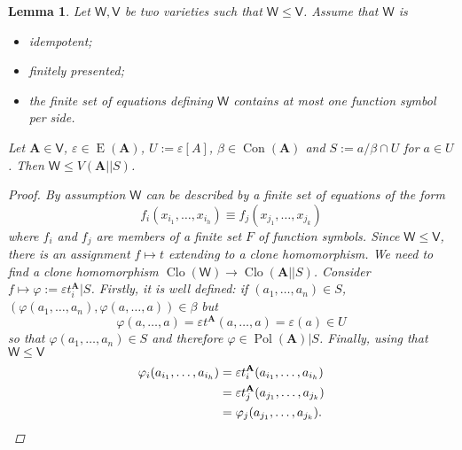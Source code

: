 \documentclass{amsart}
\theoremstyle{plain}
\newtheorem{lemma}[theorem]{Lemma}
\theoremstyle{definition}
\theoremstyle{remark}
\def\phi{\varphi}
\def\epsilon{\varepsilon}
\DeclareMathOperator{\Clo}{Clo}
\DeclareMathOperator{\Con}{Con}
\DeclareMathOperator{\Pol}{Pol}
\DeclareMathOperator{\Id}{E}
\begin{document}
\begin{lemma}
    Let $\mathsf{W}, \mathsf{V}$ be two varieties such that $\mathsf{W} \le \mathsf{V}$. 
    Assume that $\mathsf{W}$ is 
    \begin{itemize}
        \item idempotent; 
        \item finitely presented; 
        \item the finite set of equations defining $\mathsf{W}$ contains at most one function symbol per side. 
    \end{itemize}
    Let $\mathbf{A} \in \mathsf{V}$, $\epsilon \in \Id(\mathbf{A})$, $U:=\epsilon[A]$, $\beta \in \Con(\mathbf{A})$ and $S:=a/\beta \cap U$ for $a \in U$. 
    Then $\mathsf{W} \le V(\mathbf{A}||S)$. 
    \begin{proof}
        By assumption $\mathsf{W}$ can be described by a finite set of equations of the form 
        \begin{equation}
            f_i(x_{i_1}, \ldots, x_{i_h}) \equiv f_j(x_{j_1}, \ldots, x_{j_k})
        \end{equation}
        where $f_i$ and $f_j$ are members of a finite set $F$ of function symbols. 
        Since $\mathsf{W} \le  \mathsf{V}$, there is an assignment $f \mapsto t$ extending to a clone homomorphism. 
        We need to find a clone homomorphism $\Clo(\mathsf{W}) \to \Clo(\mathbf{A}||S)$. 
        Consider $f \mapsto \phi:=\epsilon t_i^\mathbf{A} |S$. 
        Firstly, it is well defined: if $(a_1, \ldots, a_n) \in S$, $(\phi(a_1, \ldots, a_n), \phi(a, \ldots, a)) \in \beta$ but 
        \begin{equation*}
            \phi(a, \ldots, a) = \epsilon t^\mathbf{A} (a, \ldots, a) = \epsilon(a) \in U
        \end{equation*}
        so that $\phi(a_1, \ldots, a_n) \in S$ and therefore $\phi \in \Pol(\mathbf{A})|S$. 
        Finally, using that $\mathsf{W} \le  \mathsf{V}$
        \begin{align*}
            \phi_i(a_{i_1}, \ldots, a_{i_h}) & = \epsilon t_i^\mathbf{A} (a_{i_1}, \ldots, a_{i_h}) \\
            & = \epsilon t_j^\mathbf{A} (a_{j_1}, \ldots, a_{j_k})\\
            & = \phi_j(a_{j_1}, \ldots, a_{j_k}) \text{.} \qedhere\\
        \end{align*} 
    \end{proof}
\end{lemma}
\end{document}
